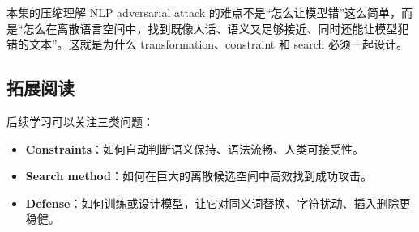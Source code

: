 \documentclass[a4paper]{article}
\begin{document}
\begin{importantbox}{本集的压缩理解}
    NLP adversarial attack 的难点不是“怎么让模型错”这么简单，而是“怎么在离散语言空间中，找到既像人话、语义又足够接近、同时还能让模型犯错的文本”。这就是为什么 transformation、constraint 和 search 必须一起设计。
\end{importantbox}

\subsection{拓展阅读}

后续学习可以关注三类问题：
\begin{itemize}
    \item \textbf{Constraints}：如何自动判断语义保持、语法流畅、人类可接受性。
    \item \textbf{Search method}：如何在巨大的离散候选空间中高效找到成功攻击。
    \item \textbf{Defense}：如何训练或设计模型，让它对同义词替换、字符扰动、插入删除更稳健。
\end{itemize}
\end{document}
